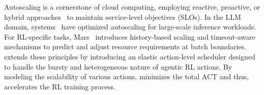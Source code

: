 Autoscaling is a cornerstone of cloud computing, employing reactive, proactive, or hybrid approaches~\citep{lorido2014review,wu2023xron,wang2024autothrottle,wu2024can,zhang2024jolteon} to maintain service-level objectives (SLOs).
In the LLM domain, systems~\citep{zhang2025blitzscale,yu2025lambda,xiang2025aegaeon,zhao2025seallm} have optimized autoscaling for large-scale inference workloads.
For RL-specific tasks, Mars~\citep{zhu2026mars} introduces history-based scaling and timeout-aware mechanisms to predict and adjust resource requirements at batch boundaries.
\sysname extends these principles by introducing an elastic action-level scheduler designed to handle the bursty and heterogeneous nature of agentic RL actions.
By modeling the scalability of various actions, \sysname minimizes the total ACT and thus, accelerates the RL training process.
